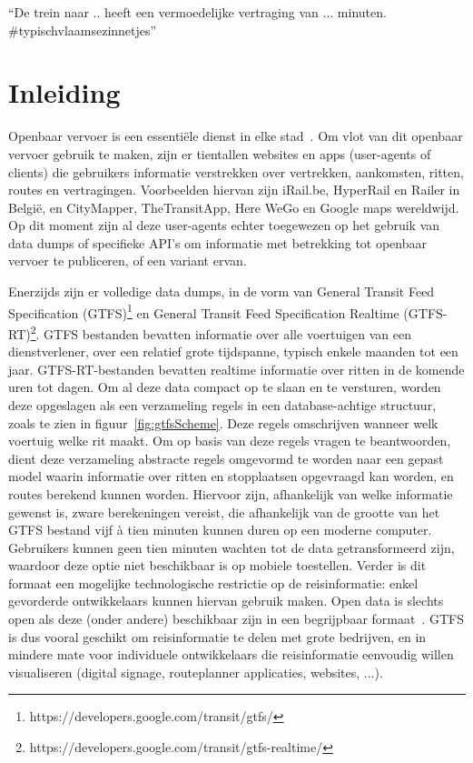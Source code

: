 \begin{savequote}[0.55\linewidth]
	``De trein naar .. heeft een vermoedelijke vertraging van ... minuten. \#typischvlaamsezinnetjes''
\end{savequote}

\chapter{Inleiding}
\label{chap:intro}
Openbaar vervoer is een essentiële dienst in elke stad~\citep{programmableweb14}. Om vlot van dit openbaar vervoer gebruik te maken, zijn er tientallen websites en apps (user-agents of clients) die gebruikers informatie verstrekken over vertrekken, aankomsten, ritten, routes en vertragingen. Voorbeelden hiervan zijn iRail.be, HyperRail en Railer in België, en CityMapper, TheTransitApp, Here WeGo en Google maps wereldwijd. Op dit moment zijn al deze user-agents echter toegewezen op het gebruik van data dumps of specifieke API's om informatie met betrekking tot openbaar vervoer te publiceren, of een variant ervan. 

Enerzijds zijn er volledige data dumps, in de vorm van General Transit Feed Specification (GTFS)\footnote{https://developers.google.com/transit/gtfs/} en General Transit Feed Specification Realtime (GTFS-RT)\footnote{https://developers.google.com/transit/gtfs-realtime/}. GTFS bestanden bevatten informatie over alle voertuigen van een dienstverlener, over een relatief grote tijdspanne, typisch enkele maanden tot een jaar. GTFS-RT-bestanden bevatten realtime informatie over ritten in de komende uren tot dagen. Om al deze data compact op te slaan en te versturen, worden deze opgeslagen als een verzameling regels in een database-achtige structuur, zoals te zien in figuur~\ref{fig:gtfsScheme}. Deze regels omschrijven wanneer welk voertuig welke rit maakt. Om op basis van deze regels vragen te beantwoorden, dient deze verzameling abstracte regels omgevormd te worden naar een gepast model waarin informatie over ritten en stopplaatsen opgevraagd kan worden, en routes berekend kunnen worden. Hiervoor zijn, afhankelijk van welke informatie gewenst is, zware berekeningen vereist, die afhankelijk van de grootte van het GTFS bestand vijf à tien minuten kunnen duren op een moderne computer. Gebruikers kunnen geen tien minuten wachten tot de data getransformeerd zijn, waardoor deze optie niet beschikbaar is op mobiele toestellen. Verder is dit formaat een mogelijke technologische restrictie op de reisinformatie: enkel gevorderde ontwikkelaars kunnen hiervan gebruik maken. Open data is slechts open als deze (onder andere) beschikbaar zijn in een begrijpbaar formaat~\citep{okfn18}. GTFS is dus vooral geschikt om reisinformatie te delen met grote bedrijven, en in mindere mate voor individuele ontwikkelaars die reisinformatie eenvoudig willen visualiseren (digital signage, routeplanner applicaties, websites, ...).

